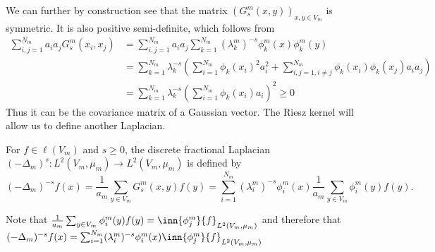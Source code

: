 We can further by construction see that the matrix $(G_s^{m}(x,y))_{x, y \in V_m}$ is symmetric. It is also positive semi-definite, which follows from
\begin{align}
	\sum_{i,j = 1}^{N_m}a_i a_j G_s^{m}(x_i, x_j) &= \sum_{i,j = 1}^{N_m}a_i a_j \sum_{k = 1}^{N_m} (\lambda_k^{m})^{-s} \phi_{k}^{m}(x)\phi_{k}^{m}(y) \\
	&=\sum_{k =1}^{N_m} \lambda_k^{-s} \left(\sum_{i = 1}^{N_m} \phi_k (x_i)^2 a_i^2 + \sum_{i, j = 1, i \neq j}^{N_m}\phi_k (x_i)\phi_k(x_j) a_ia_j\right) \\
	&= \sum_{k =1}^{N_m} \lambda_k^{-s} \left(\sum_{i = 1}^{N_m} \phi_k (x_i) a_i \right)^2 \geq 0
\end{align}
Thus it can be the covariance matrix of a Gaussian vector. The Riesz kernel will allow us to define another Laplacian.
\begin{defi}\label{discreteFractionalLaplacian}
	For $f \in \ell(V_m)$ and $s \geq 0$, the discrete fractional Laplacian $(-\Delta_m)^{s}: L^{2}(V_m, \mu_m) \to L^{2}(V_m, \mu_m)$ is defined by
	\begin{equation}
		(-\Delta_{m})^{-s}f(x) = \frac{1}{a_m} \sum_{y \in V_m} G_{s}^{m}(x,y)f(y) = \sum_{i = 1}^{N_m} (\lambda_{i}^{m})^{-s} \phi_{i}^{m}(x) \frac{1}{a_m} \sum_{y \in V_m} \phi_{i}^{m}(y)f(y).
	\end{equation}
\end{defi}
\begin{remark*}
	Note that $\frac{1}{a_m} \sum_{y \in V_m} \phi_{i}^{m}(y)f(y) = \inn{\phi^{m}_j}{f}_{L^{2}(V_m, \mu_m)}$ and therefore that $(-\Delta_{m})^{-s}f(x) = \sum_{i = 1}^{N_m} (\lambda_{i}^{m})^{-s} \phi_{i}^{m}(x) \inn{\phi_j^{m}}{f}_{L^2(V_m, \mu_m)}$
\end{remark*}

